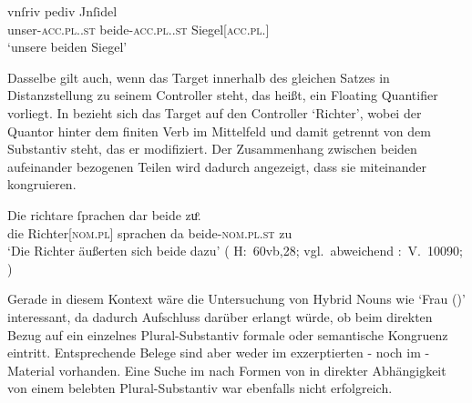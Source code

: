 \begin{exe}
\ex \label{ex:gendassgmt1_txt}
	\gll vnſriv pediv Jnſidel \\
		unser-\textsc{acc.pl.\NeutI.st} beide-\textsc{acc.pl.\NeutI.st}
			Siegel[\textsc{acc.pl.\NeutI}] \\
	\trans `unsere beiden Siegel'
		\parencites(Nr.~3224~A, Freising, 1299)[400,12--13]{cao4}
\end{exe}


Dasselbe gilt auch, wenn das Target innerhalb des gleichen Satzes in
Distanzstellung zu seinem Controller steht, das heißt, ein Floating Quantifier
vorliegt. In  bezieht sich das Target  auf den
Controller  `Richter', wobei der Quantor hinter dem finiten Verb
im Mittelfeld und damit getrennt von dem Substantiv steht, das er modifiziert.
Der Zusammenhang zwischen beiden aufeinander bezogenen Teilen wird dadurch
angezeigt, dass sie miteinander kongruieren.

\begin{exe}
\ex \label{ex:gendassgmt2}
	\gll Die richtare ſprachen dar beide zuͦ. \\
		die Richter[\textsc{nom.pl\subM}] sprachen da
		beide-\textsc{nom.pl\subM.st} zu \\
	\trans `Die Richter äußerten sich beide dazu'
		(%
			H:~60vb,28; vgl.~abweichend
			\KC:~V.~10090;
			\cite[267]{schroeder1895}%
		)
\end{exe}

Gerade in diesem Kontext wäre die Untersuchung von Hybrid Nouns wie 
`Frau (\NeutF)' interessant, da dadurch Aufschluss darüber erlangt würde, ob
beim direkten Bezug auf ein einzelnes Plural-Substantiv formale oder
semantische Kongruenz eintritt. Entsprechende Belege sind aber weder im
exzerptierten \CAO{}- noch im \KC{}-Material vorhanden. Eine Suche im \REM{}
nach Formen von  in direkter Abhängigkeit von einem belebten
Plural-Substantiv war ebenfalls nicht erfolgreich.


